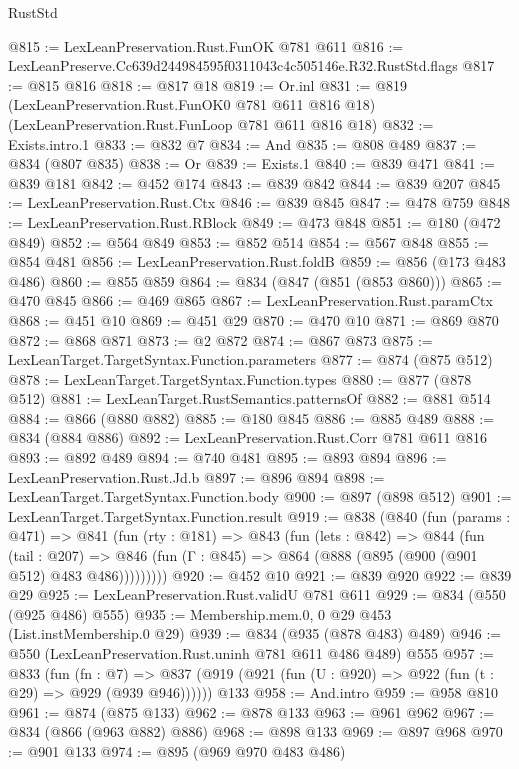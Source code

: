 \begin{lexlean}{RustStd}
\begin{coremodule}
@815 := LexLeanPreservation.Rust.FunOK @781 @611
@816 := LexLeanPreserve.Cc639d244984595f0311043c4c505146e.R32.RustStd.flags
@817 := @815 @816
@818 := @817 @18
@819 := Or.inl
@831 := @819
    (LexLeanPreservation.Rust.FunOK0 @781 @611 @816 @18)
    (LexLeanPreservation.Rust.FunLoop @781 @611 @816 @18)
@832 := Exists.intro.{1}
@833 := @832 @7
@834 := And
@835 := @808 @489
@837 := @834 (@807 @835)
@838 := Or
@839 := Exists.{1}
@840 := @839 @471
@841 := @839 @181
@842 := @452 @174
@843 := @839 @842
@844 := @839 @207
@845 := LexLeanPreservation.Rust.Ctx
@846 := @839 @845
@847 := @478 @759
@848 := LexLeanPreservation.Rust.RBlock
@849 := @473 @848
@851 := @180 (@472 @849)
@852 := @564 @849
@853 := @852 @514
@854 := @567 @848
@855 := @854 @481
@856 := LexLeanPreservation.Rust.foldB
@859 := @856 (@173 @483 @486)
@860 := @855 @859
@864 := @834 (@847 (@851 (@853 @860)))
@865 := @470 @845
@866 := @469 @865
@867 := LexLeanPreservation.Rust.paramCtx
@868 := @451 @10
@869 := @451 @29
@870 := @470 @10
@871 := @869 @870
@872 := @868 @871
@873 := @2 @872
@874 := @867 @873
@875 := LexLeanTarget.TargetSyntax.Function.parameters
@877 := @874 (@875 @512)
@878 := LexLeanTarget.TargetSyntax.Function.types
@880 := @877 (@878 @512)
@881 := LexLeanTarget.RustSemantics.patternsOf
@882 := @881 @514
@884 := @866 (@880 @882)
@885 := @180 @845
@886 := @885 @489
@888 := @834 (@884 @886)
@892 := LexLeanPreservation.Rust.Corr @781 @611 @816
@893 := @892 @489
@894 := @740 @481
@895 := @893 @894
@896 := LexLeanPreservation.Rust.Jd.b
@897 := @896 @894
@898 := LexLeanTarget.TargetSyntax.Function.body
@900 := @897 (@898 @512)
@901 := LexLeanTarget.TargetSyntax.Function.result
@919 := @838
    (@840
      (fun (params : @471) =>
      @841
        (fun (rty : @181) =>
        @843
          (fun (lets : @842) =>
          @844
            (fun (tail : @207) =>
            @846 (fun (Γ : @845) => @864 (@888 (@895 (@900 (@901 @512) @483 @486)))))))))
@920 := @452 @10
@921 := @839 @920
@922 := @839 @29
@925 := LexLeanPreservation.Rust.validU @781 @611
@929 := @834 (@550 (@925 @486) @555)
@935 := Membership.mem.{0, 0} @29 @453 (List.instMembership.{0} @29)
@939 := @834 (@935 (@878 @483) @489)
@946 := @550 (LexLeanPreservation.Rust.uninh @781 @611 @486 @489) @555
@957 := @833
    (fun (fn : @7) =>
    @837 (@919 (@921 (fun (U : @920) => @922 (fun (t : @29) => @929 (@939 @946))))))
    @133
@958 := And.intro
@959 := @958 @810
@961 := @874 (@875 @133)
@962 := @878 @133
@963 := @961 @962
@967 := @834 (@866 (@963 @882) @886)
@968 := @898 @133
@969 := @897 @968
@970 := @901 @133
@974 := @895 (@969 @970 @483 @486)

\end{coremodule}
\end{lexlean}
